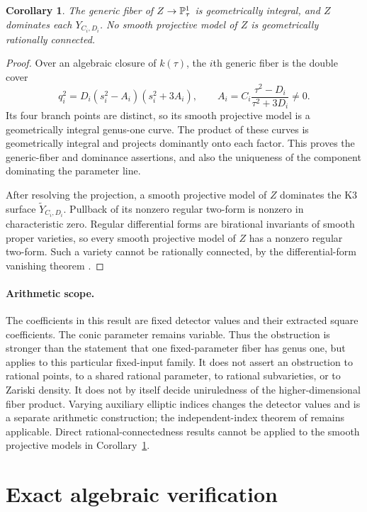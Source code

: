 \documentclass[11pt,a4paper]{article}
\newtheorem{corollary}[theorem]{Corollary}
\begin{document}
\begin{corollary}\label{cor:notrc}
The generic fiber of $Z\to\mathbb P^1_\tau$ is geometrically integral,
and $Z$ dominates each $Y_{C_i,D_i}$. No smooth projective model
of $Z$ is geometrically rationally connected.
\end{corollary}
\begin{proof}
Over an algebraic closure of $k(\tau)$, the $i$th generic fiber
is the double cover
\[
       q_i^2=D_i(s_i^2-A_i)(s_i^2+3A_i),\qquad
       A_i=C_i\frac{\tau^2-D_i}{\tau^2+3D_i}\ne0.
\]
Its four branch points are distinct, so its smooth projective
model is a geometrically integral genus-one curve. The product
of these curves is geometrically integral and projects
dominantly onto each factor. This proves the generic-fiber and
dominance assertions, and also the uniqueness of the component
dominating the parameter line.

After resolving the projection, a smooth projective model of $Z$
dominates the K3 surface $\widetilde Y_{C_i,D_i}$. Pullback of
its nonzero regular two-form is nonzero in characteristic zero.
Regular differential forms are birational invariants of smooth
proper varieties, so every smooth projective model of $Z$ has
a nonzero regular two-form. Such a variety cannot be rationally
connected, by the differential-form vanishing theorem
\cite[Proposition 2.5(b)]{Debarre}.
\end{proof}

\paragraph{Arithmetic scope.}
The coefficients in this result are fixed detector values and their
extracted square coefficients. The conic parameter remains variable.
Thus the obstruction is stronger than the statement that one
fixed-parameter fiber has genus one, but applies to this particular
fixed-input family. It does not assert an obstruction to rational
points, to a shared rational parameter, to rational subvarieties, or
to Zariski density. It does not by itself decide uniruledness of
the higher-dimensional fiber product. Varying auxiliary elliptic
indices changes the detector values and is a separate arithmetic
construction; the independent-index theorem of \cite{Guards}
remains applicable. Direct rational-connectedness results cannot
be applied to the smooth projective models in
Corollary~\ref{cor:notrc}.

\section{Exact algebraic verification}
\end{document}
